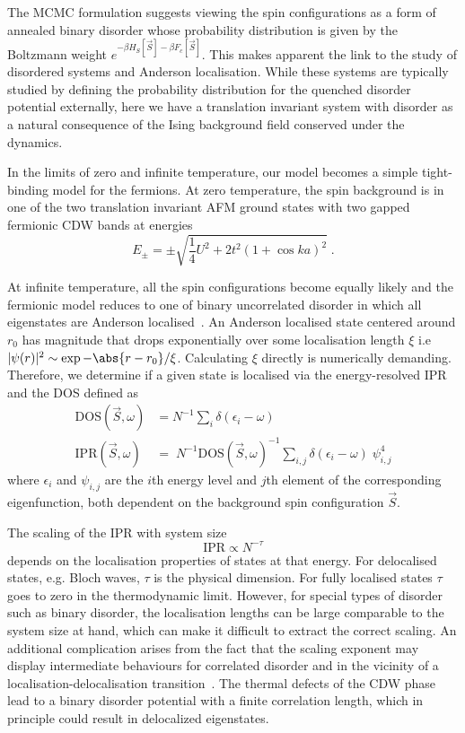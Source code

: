 The \ac{MCMC} formulation suggests viewing the spin configurations as a form of annealed binary disorder whose probability distribution is given by the Boltzmann weight \(e^{-\beta H_S[\vec{S}] - \beta F_c[\vec{S}]}\). This makes apparent the link to the study of disordered systems and Anderson localisation. While these systems are typically studied by defining the probability distribution for the quenched disorder potential externally, here we have a translation invariant system with disorder as a natural consequence of the Ising background field conserved under the dynamics.  
%

In the limits of zero and infinite temperature, our model becomes a simple tight-binding model for the fermions. At zero temperature, the spin background is in one of the two translation invariant AFM ground states with two gapped fermionic CDW bands at energies
\[E_{\pm} = \pm\sqrt{\frac{1}{4}U^2 + 2t^2(1 + \cos ka)^2}\;.\]

At infinite temperature, all the spin configurations become equally likely and the fermionic model reduces to one of binary uncorrelated disorder in which all eigenstates are Anderson localised~\cite{abrahamsScalingTheoryLocalization1979}. An Anderson localised state centered around \(r_0\) has magnitude that drops exponentially over some localisation length \(\xi\) i.e \(|\psi(r)|^2 \sim \exp{-\abs{r - r_0}/\xi}\). Calculating $\xi$ directly is numerically demanding. Therefore, we determine if a given state is localised via the energy-resolved \ac{IPR} and the \ac{DOS} defined as
\begin{align}
\mathrm{DOS}(\vec{S}, \omega)& = N^{-1} \sum_{i} \delta(\epsilon_i - \omega)\\
\mathrm{IPR}(\vec{S}, \omega)& = \; N^{-1} \mathrm{DOS}(\vec{S}, \omega)^{-1} \sum_{i,j} \delta(\epsilon_i - \omega)\;\psi^{4}_{i,j}
\end{align}
where \(\epsilon_i\) and \(\psi_{i,j}\) are the \(i\)th energy level and \(j\)th element of the corresponding eigenfunction, both dependent on the background spin configuration \(\vec{S}\). 

The scaling of the IPR with system size
\[\mathrm{IPR} \propto N^{-\tau}\]
depends on the localisation properties of states at that energy. For delocalised states, e.g. Bloch waves, \(\tau\) is the physical dimension. For fully localised states \(\tau\) goes to zero in the thermodynamic limit. However, for special types of disorder such as binary disorder, the localisation lengths can be large comparable to the system size at hand, which can make it difficult to extract the correct scaling. An additional complication arises from the fact that the scaling exponent may display intermediate behaviours for correlated disorder and in the vicinity of a localisation-delocalisation transition~\cite{kramerLocalizationTheoryExperiment1993, eversAndersonTransitions2008a}. The thermal defects of the CDW phase lead to a binary disorder potential with a finite correlation length, which in principle could result in delocalized eigenstates.  

